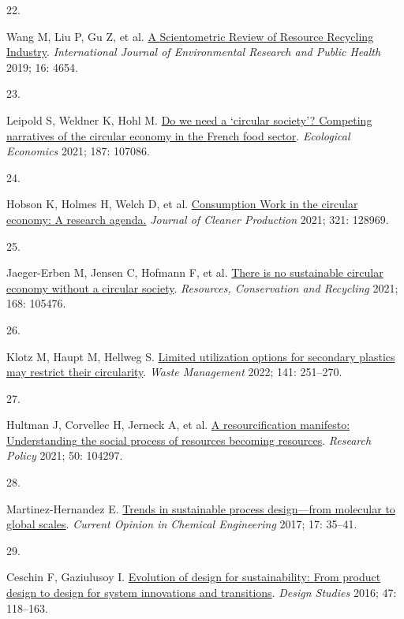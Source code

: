 \documentclass[
  11pt,
  a4paperpaper,
  onecolumn]{article}
\newlength{\cslhangindent}
\newlength{\csllabelwidth}
\newlength{\cslentryspacingunit} %
\newenvironment{CSLReferences}[2] %
 {%
  \setlength{\parindent}{0pt}
  \ifodd #1
  \let\oldpar\par
  \def\par{\hangindent=\cslhangindent\oldpar}
  \fi
  \setlength{\parskip}{#2\cslentryspacingunit}
 }%
 {}
\newcommand{\CSLLeftMargin}[1]{\parbox[t]{\csllabelwidth}{#1}}
\newcommand{\CSLRightInline}[1]{\parbox[t]{\linewidth - \csllabelwidth}{#1}\break}
\begin{document}
\begin{CSLReferences}{0}{0}
\leavevmode{}%
\CSLLeftMargin{22. }%
\CSLRightInline{Wang M, Liu P, Gu Z, et al.
\href{https://doi.org/10.3390/ijerph16234654}{A {Scientometric Review}
of {Resource Recycling Industry}}. \emph{International Journal of
Environmental Research and Public Health} 2019; 16: 4654.}

\leavevmode{}%
\CSLLeftMargin{23. }%
\CSLRightInline{Leipold S, Weldner K, Hohl M.
\href{https://doi.org/10.1016/j.ecolecon.2021.107086}{Do we need a
{`circular society'}? {Competing} narratives of the circular economy in
the {French} food sector}. \emph{Ecological Economics} 2021; 187:
107086.}

\leavevmode{}%
\CSLLeftMargin{24. }%
\CSLRightInline{Hobson K, Holmes H, Welch D, et al.
\href{https://doi.org/10.1016/J.JCLEPRO.2021.128969}{Consumption {Work}
in the circular economy: {A} research agenda.} \emph{Journal of Cleaner
Production} 2021; 321: 128969.}

\leavevmode{}%
\CSLLeftMargin{25. }%
\CSLRightInline{Jaeger-Erben M, Jensen C, Hofmann F, et al.
\href{https://doi.org/10.1016/j.resconrec.2021.105476}{There is no
sustainable circular economy without a circular society}.
\emph{Resources, Conservation and Recycling} 2021; 168: 105476.}

\leavevmode{}%
\CSLLeftMargin{26. }%
\CSLRightInline{Klotz M, Haupt M, Hellweg S.
\href{https://doi.org/10.1016/J.WASMAN.2022.01.002}{Limited utilization
options for secondary plastics may restrict their circularity}.
\emph{Waste Management} 2022; 141: 251--270.}

\leavevmode{}%
\CSLLeftMargin{27. }%
\CSLRightInline{Hultman J, Corvellec H, Jerneck A, et al.
\href{https://doi.org/10.1016/j.respol.2021.104297}{A resourcification
manifesto: {Understanding} the social process of resources becoming
resources}. \emph{Research Policy} 2021; 50: 104297.}

\leavevmode{}%
\CSLLeftMargin{28. }%
\CSLRightInline{Martinez-Hernandez E.
\href{https://doi.org/10.1016/j.coche.2017.05.005}{Trends in sustainable
process design---from molecular to global scales}. \emph{Current Opinion
in Chemical Engineering} 2017; 17: 35--41.}

\leavevmode{}%
\CSLLeftMargin{29. }%
\CSLRightInline{Ceschin F, Gaziulusoy I.
\href{https://doi.org/10.1016/j.destud.2016.09.002}{Evolution of design
for sustainability: {From} product design to design for system
innovations and transitions}. \emph{Design Studies} 2016; 47: 118--163.}


\end{CSLReferences}
\end{document}
